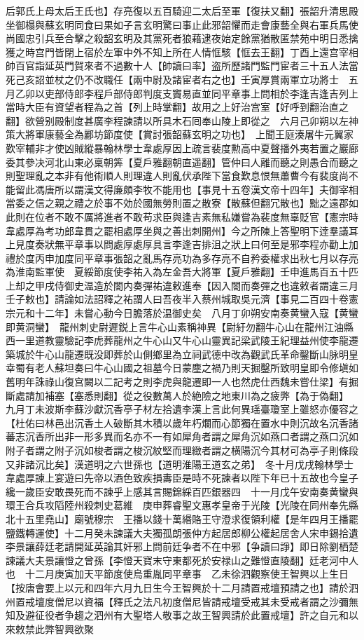 后郭氏上母太后王氏也】存亮復以五百騎迎二太后至軍【復扶又翻】張韶升清思殿坐御榻與蘇玄明同食曰果如子言玄明驚曰事止此邪韶懼而走會康藝全與右軍兵馬使尚國忠引兵至合擊之殺韶玄明及其黨死者狼藉逮夜始定餘黨猶散匿禁苑中明日悉擒獲之時宫門皆閉上宿於左軍中外不知上所在人情恇駭【恇去王翻】丁酉上還宫宰相帥百官詣延英門賀來者不過數十人【帥讀曰率】盗所歷諸門監門宦者三十五人法當死己亥詔並杖之仍不改職任【兩中尉及諸宦者右之也】壬寅厚賞兩軍立功將士　五月乙卯以吏部侍郎李程戶部侍郎判度支竇易直並同平章事上問相於李逢吉逢吉列上當時大臣有資望者程為之首【列上時掌翻】故用之上好治宫室【好呼到翻治直之翻】欲營别殿制度甚廣李程諫請以所具木石囘奉山陵上即從之　六月己卯朔以左神策大將軍康藝全為酈坊節度使【賞討張韶蘇玄明之功也】　上聞王庭湊屠牛元翼家歎宰輔非才使凶賊縱暴翰林學士韋處厚因上疏言裴度勲高中夏聲播外夷若置之巖廊委其參决河北山東必稟朝筭【夏戶雅翻朝直遥翻】管仲曰人離而聽之則愚合而聽之則聖理亂之本非有他術順人則理違人則亂伏承陛下當食歎息恨無蕭曹今有裴度尚不能留此馮唐所以謂漢文得廉頗李牧不能用也【事見十五卷漢文帝十四年】夫御宰相當委之信之親之禮之於事不効於國無勞則置之散寮【散蘇但翻冗散也】黜之遠郡如此則在位者不敢不厲將進者不敢苟求臣與逢吉素無私嫌嘗為裴度無辜貶官【憲宗時韋處厚為考功郎韋貫之罷相處厚坐與之善出刺開州】今之所陳上答聖明下逹羣議耳上見度奏狀無平章事以問處厚處厚具言李逢吉排沮之狀上曰何至是邪李程亦勸上加禮於度丙申加度同平章事張韶之亂馬存亮功為多存亮不自矜委權求出秋七月以存亮為淮南監軍使　夏綏節度使李祐入為左金吾大將軍【夏戶雅翻】壬申進馬百五十匹上却之甲戌侍御史温造於閤内奏彈祐違敕進奉【因入閤而奏彈之也違敕者謂違三月壬子敕也】請論如法詔釋之祐謂人曰吾夜半入蔡州城取吳元濟【事見二百四十卷憲宗元和十二年】未嘗心動今日膽落於温御史矣　八月丁卯朔安南奏黄蠻入寇【黄蠻即黄洞蠻】　龍州刺史尉遲鋭上言牛心山素稱神異【尉紆勿翻牛心山在龍州江油縣西一里道教靈驗記李虎葬龍州之牛心山又牛心山靈異記梁武陵王紀理益州使李龍遷築城於牛心山龍遷既没即葬於山側鄉里為立祠武德中改為觀武氏革命鑿斷山脉明皇幸蜀有老人蘇坦奏曰牛心山國之祖墓今日蒙塵之禍乃則天掘鑿所致明皇即令修塡如舊明年誅祿山復宫闕以二記考之則李虎與龍遷即一人也然虎仕西魏未嘗仕梁】有掘斷處請加補塞【塞悉則翻】從之役數萬人於絶險之地東川為之疲弊【為于偽翻】　九月丁未波斯李蘇沙獻沉香亭子材左拾遺李漢上言此何異瑶臺瓊室上雖怒亦優容之【杜佑曰林邑出沉香土人破斷其木積以歲年朽爛而心節獨在置水中則沉故名沉香諸蕃志沉香所出非一形多異而名亦不一有如犀角者謂之犀角沉如燕口者謂之燕口沉如附子者謂之附子沉如梭者謂之梭沉紋堅而理緻者謂之横陽沉今其材可為亭子則條段又非諸沉比矣】漢道明之六世孫也【道明淮陽王道玄之弟】　冬十月戊戌翰林學士韋處厚諫上宴遊曰先帝以酒色致疾損夀臣是時不死諫者以陛下年已十五故也今皇子纔一歲臣安敢畏死而不諫乎上感其言賜錦綵百匹銀器四　十一月戊午安南奏黄蠻與環王合兵攻䧟陸州殺刺史葛維　庚申葬睿聖文惠孝皇帝于光陵【光陵在同州奉先縣北十五里堯山】廟號穆宗　王播以錢十萬緡賂王守澄求復領利權【是年四月王播罷鹽鐵轉運使】十二月癸未諫議大夫獨孤朗張仲方起居郎柳公權起居舍人宋申錫拾遺李景讓薛廷老請開延英論其奸邪上問前廷争者不在中邪【争讀曰諍】即日除劉栖楚諫議大夫景讓憕之曾孫【李憕天寶末守東都死於安禄山之難憕直陵翻】廷老河中人也　十二月庚寅加天平節度使烏重胤同平章事　乙未徐泗觀察使王智興以上生日【按唐會要上以元和四年六月九日生今王智興於十二月請置戒壇預請之也】請於泗州置戒壇度僧尼以資福【釋氏之法凡初度僧尼皆請戒壇受戒其未受戒者謂之沙彌無知及避征役者争趨之泗州有大聖塔人敬事之故王智興請於此置戒壇】許之自元和以來敕禁此弊智興欲聚